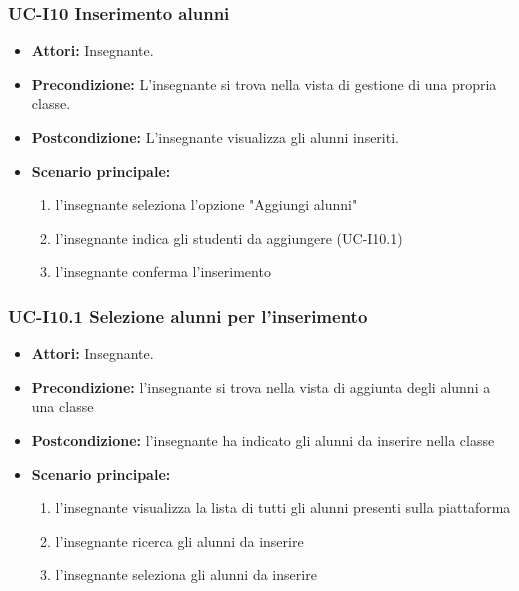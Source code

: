 \subsubsection{UC-I10 Inserimento alunni}
\begin{itemize}
	\item \textbf{Attori:} Insegnante.
	\item \textbf{Precondizione:} L'insegnante si trova nella vista di gestione di una propria classe.
	\item \textbf{Postcondizione:} L'insegnante visualizza gli alunni inseriti.
	\item \textbf{Scenario principale:}
	\begin{enumerate}
		\item l'insegnante seleziona l'opzione "Aggiungi alunni"
		\item l'insegnante indica gli studenti da aggiungere (UC-I10.1)
		\item l'insegnante conferma l'inserimento
	\end{enumerate}
\end{itemize}

\subsubsection{UC-I10.1 Selezione alunni per l'inserimento}
\begin{itemize}
	\item \textbf{Attori:} Insegnante.
	\item \textbf{Precondizione:} l'insegnante si trova nella vista di aggiunta degli alunni a una classe
	\item \textbf{Postcondizione:} l'insegnante ha indicato gli alunni da inserire nella classe
	\item \textbf{Scenario principale:}
	\begin{enumerate}
		\item l'insegnante visualizza la lista di tutti gli alunni presenti sulla piattaforma
		\item l'insegnante ricerca gli alunni da inserire
		\item l'insegnante seleziona gli alunni da inserire
	\end{enumerate}
\end{itemize}

